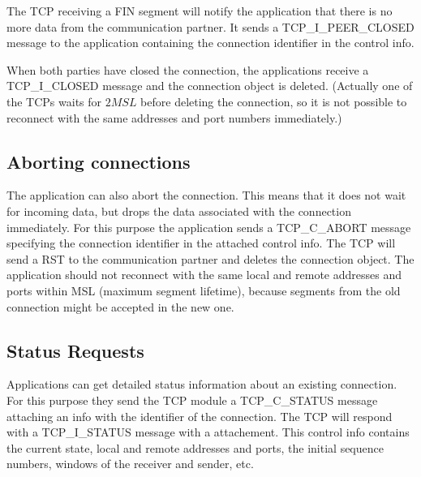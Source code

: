 The TCP receiving a FIN segment will notify the application that
there is no more data from the communication partner. It sends
a TCP\_I\_PEER\_CLOSED message to the application containing
the connection identifier in the control info.

When both parties have closed the connection, the applications
receive a TCP\_I\_CLOSED message and the connection object is
deleted. (Actually one of the TCPs waits for $2 MSL$ before
deleting the connection, so it is not possible to reconnect
with the same addresses and port numbers immediately.)

\subsection{Aborting connections}

The application can also abort the connection. This means that
it does not wait for incoming data, but drops the data associated
with the connection immediately. For this purpose the application
sends a TCP\_C\_ABORT message specifying the connection identifier
in the attached control info. The TCP will send a RST to the
communication partner and deletes the connection object. The application
should not reconnect with the same local and remote addresses and
ports within MSL (maximum segment lifetime), because segments
from the old connection might be accepted in the new one.

\subsection{Status Requests}

Applications can get detailed status information about an existing
connection. For this purpose they send the TCP module a TCP\_C\_STATUS
message attaching an  info with the identifier
of the connection. The TCP will respond with a TCP\_I\_STATUS message
with a  attachement. This control info
contains the current state, local and remote addresses and ports,
the initial sequence numbers, windows of the receiver and sender, etc.

